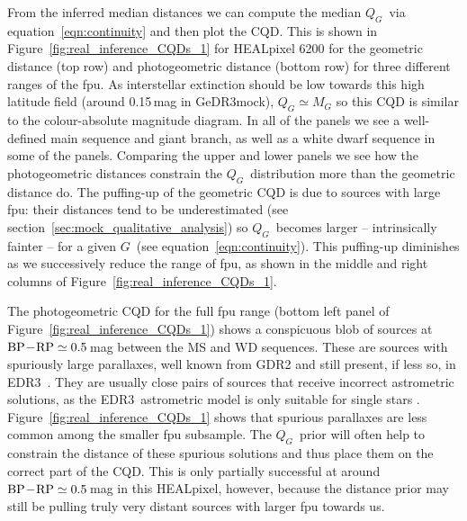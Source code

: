 \documentclass[twocolumn]{aastex62}
\providecommand{\gdr}[1]{GDR{#1}}
\providecommand{\mock}{GeDR3mock}
\providecommand{\release}{EDR3}
\providecommand{\gmag}{\ensuremath{G}}
\providecommand{\MG}{\ensuremath{M_G}}
\providecommand{\QG}{\ensuremath{Q_G}}
\providecommand{\bprp}{\ensuremath{{\rm BP} \! - \! {\rm RP}}}
\providecommand{\parallax}{\ensuremath{\varpi}}
\providecommand{\sigparallax}{\ensuremath{\sigma_{\varpi}}}
\providecommand{\fpu}{\ensuremath{\sigparallax/\parallax}}
\begin{document}
From the inferred median distances we can compute the median \QG\ via equation~\ref{eqn:continuity} and then plot the CQD. This is shown in Figure~\ref{fig:real_inference_CQDs_1} for HEALpixel 6200 for the geometric distance (top row) and photogeometric distance (bottom row) for three different ranges of the fpu.  
As interstellar extinction should be low towards this high latitude field (around 0.15\,mag in \mock),
$\QG \simeq \MG$ so this CQD is similar to the colour-absolute magnitude diagram.
In all of the panels we see a well-defined main sequence and giant branch, as well as a white dwarf sequence in some of the panels.
Comparing the upper and lower panels we  see how the photogeometric distances constrain the \QG\ distribution more than the geometric distance do. 
The puffing-up of the geometric CQD is due to sources with large fpu: their distances tend to be underestimated (see section~\ref{sec:mock_qualitative_analysis}) so \QG\ becomes larger -- intrinsically fainter -- for a given \gmag\ (see equation~\ref{eqn:continuity}).
This puffing-up diminishes as we successively reduce the range of fpu, as shown in the middle and right columns of Figure~\ref{fig:real_inference_CQDs_1}.

The photogeometric CQD for the full fpu range (bottom left panel of Figure~\ref{fig:real_inference_CQDs_1}) shows a conspicuous blob of sources at $\bprp \simeq 0.5$\,mag between the MS and WD sequences. 
These are sources with spuriously large parallaxes, well known from \gdr{2} \citep{2018A&A...616A..17A} and still present, if less so, in \release\ \citep{fabricius_etal_gedr3_validation, gedr3_nearbystars}.
They are usually close pairs of sources that receive incorrect astrometric solutions, as the \release\ astrometric model is only suitable for single stars \citep{lindegren_etal_gedr3_astrometry}. Figure~\ref{fig:real_inference_CQDs_1} shows
that spurious parallaxes are less common among the smaller fpu subsample. 
The \QG\ prior will often help to constrain the distance of these spurious solutions and thus place them on the correct part of the CQD. This is only partially successful at around $\bprp \simeq 0.5$\,mag in this HEALpixel, however, because the distance prior may still be pulling truly very distant sources with larger fpu towards us.
\end{document}
